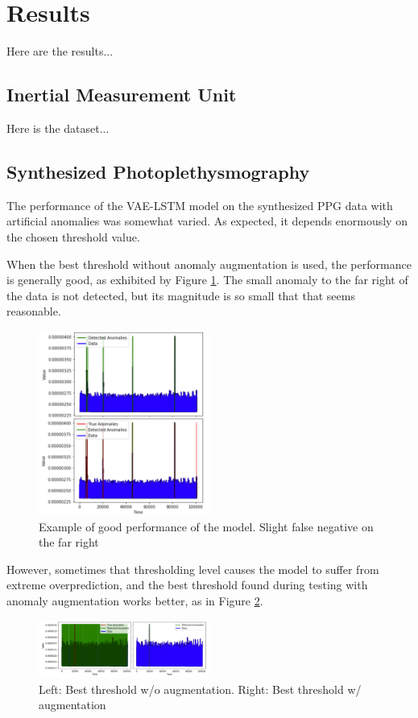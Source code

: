 \documentclass[conference]{IEEEtran}
\begin{document}
\section{Results}
Here are the results...

\subsection{Inertial Measurement Unit}
Here is the dataset...

\subsection{Synthesized Photoplethysmography}
The performance of the VAE-LSTM model on the synthesized PPG data with artificial anomalies was somewhat varied. As expected, it depends enormously on the chosen threshold value.

When the best threshold without anomaly augmentation is used, the performance is generally good, as exhibited by Figure \ref{ck_fig_2}. The small anomaly to the far right of the data is not detected, but its magnitude is so small that that seems reasonable.

\begin{figure}[htbp]
    \centering
    \includegraphics[width=0.5\textwidth]{ck_fig_2.png}
    \caption{Example of good performance of the model. Slight false negative on the far right}
    \label{ck_fig_2}
\end{figure}

However, sometimes that thresholding level causes the model to suffer from extreme overprediction, and the best threshold found during testing with anomaly augmentation works better, as in Figure \ref{ck_fig_3}.

\begin{figure}[htbp]
    \centering
    \includegraphics[width=0.5\textwidth]{ck_fig_3.png}
    \caption{Left: Best threshold w/o augmentation. Right: Best threshold w/ augmentation}
    \label{ck_fig_3}
\end{figure}
\end{document}
